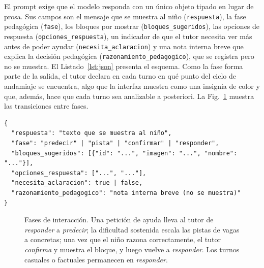 \documentclass[conference]{IEEEtran}
\begin{document}
El prompt exige que el modelo responda con un único objeto tipado en lugar de prosa. Sus campos son el mensaje que se muestra al niño (\texttt{respuesta}), la fase pedagógica (\texttt{fase}), los bloques por mostrar (\texttt{bloques\_sugeridos}), las opciones de respuesta (\texttt{opciones\_respuesta}), un indicador de que el tutor necesita ver más antes de poder ayudar (\texttt{necesita\_aclaracion}) y una nota interna breve que explica la decisión pedagógica (\texttt{razonamiento\_pedagogico}), que se registra pero no se muestra. El Listado~\ref{lst:json} presenta el esquema. Como la fase forma parte de la salida, el tutor declara en cada turno en qué punto del ciclo de andamiaje se encuentra, algo que la interfaz muestra como una insignia de color y que, además, hace que cada turno sea analizable a posteriori. La Fig.~\ref{fig:phases} muestra las transiciones entre fases.

\begin{lstlisting}[style=promptbox, caption={Respuesta tipada que el modelo debe devolver.}, label={lst:json}]
{
  "respuesta": "texto que se muestra al niño",
  "fase": "predecir" | "pista" | "confirmar" | "responder",
  "bloques_sugeridos": [{"id": "...", "imagen": "...", "nombre": "..."}],
  "opciones_respuesta": ["...", "..."],
  "necesita_aclaracion": true | false,
  "razonamiento_pedagogico": "nota interna breve (no se muestra)"
}
\end{lstlisting}

\begin{figure}[!t]
\centering
{}
\caption{Fases de interacción. Una petición de ayuda lleva al tutor de \emph{responder} a \emph{predecir}; la dificultad sostenida escala las pistas de vagas a concretas; una vez que el niño razona correctamente, el tutor \emph{confirma} y muestra el bloque, y luego vuelve a \emph{responder}. Los turnos casuales o factuales permanecen en \emph{responder}.}
\label{fig:phases}
\end{figure}
\end{document}
